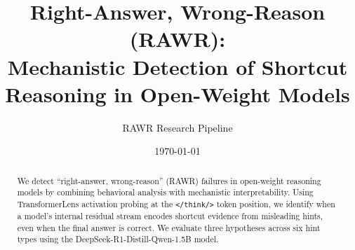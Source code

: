 \documentclass[11pt, a4paper]{article}
\title{Right-Answer, Wrong-Reason (RAWR): \\ Mechanistic Detection of Shortcut Reasoning in Open-Weight Models}
\author{RAWR Research Pipeline}
\date{\today}
\begin{document}
\maketitle

\begin{abstract}
We detect ``right-answer, wrong-reason'' (RAWR) failures in open-weight reasoning models by combining behavioral analysis with mechanistic interpretability. Using TransformerLens activation probing at the \texttt{</think/>} token position, we identify when a model's internal residual stream encodes shortcut evidence from misleading hints, even when the final answer is correct. We evaluate three hypotheses across six hint types using the DeepSeek-R1-Distill-Qwen-1.5B model.
\end{abstract}









\end{document}
